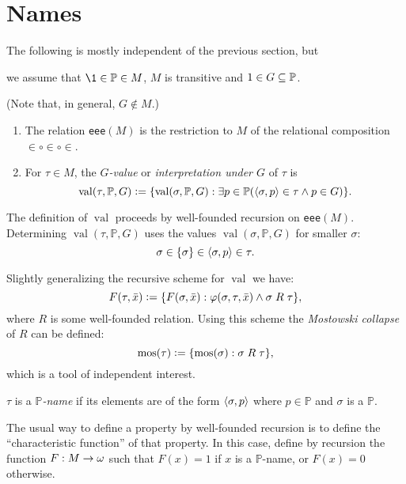 \documentclass[11pt,english]{article}
\renewcommand{\PP}{\mathbb{P}}
\DeclareMathOperator{\val}{val}
\begin{document}
\section{Names}
\begin{framed}
  The following is mostly independent of the previous section, but %
  \begin{bfseries}%
    we assume that $\1\in\PP\in M$, $M$ is transitive and 
    $1\in G\sbq\PP$.
  \end{bfseries}
  (Note that, in general, $G\notin M$.)
\end{framed}

\begin{definition}
  \begin{enumerate}
  \item The relation \verb|eee|$(M)$ is the restriction to $M$ of the
    relational composition 
    ${\in}\circ{\in}\circ{\in}$. 
  \item For $\tau\in M$, the \emph{$G$-value} or \emph{interpretation
    under $G$} of $\tau$ is
    \[
    \val(\tau,\PP,G)\defi \{\val(\sigma,\PP,G) : \exists p\in \PP
    (\lb\sigma,p\rb\in\tau \y p\in G)\}.
    \]
  \end{enumerate}
\end{definition}

The definition of $\val$ proceeds by well-founded recursion on
\verb|eee|$(M)$. Determining  $\val(\tau,\PP,G)$ uses the values
$\val(\sigma,\PP,G)$ for smaller $\sigma$:
\[
\sigma\in\{\sigma\}\in\langle\sigma,p\rangle\in\tau.
\]

\begin{remark}
  Slightly generalizing the recursive scheme for $\val$ we have:
  \[
  F(\tau,\bar{x})\mathrel{\mathop:}= \{F(\sigma,\bar{x}) : \varphi(\sigma,\tau,\bar{x}) \wedge
  \sigma\mathrel{R}\tau\}, 
  \]
  where $R$ is some well-founded relation. Using this scheme the
  \emph{Mostowski collapse} of $R$ can be defined:
  \[
  \operatorname{mos}(\tau)\mathrel{\mathop:}= \{\operatorname{mos}(\sigma) : \sigma\mathrel{R}\tau\},
  \]
  which is a tool of independent interest.
\end{remark}

\begin{definition}
  $\tau$ is a \emph{$\PP$-name} if its elements are of the form
  $\langle\sigma,p\rangle$ where $p\in\PP$ and $\sigma$ is a $\PP$.
\end{definition}
The usual way to define a property by well-founded recursion is to
define the ``characteristic function'' of that property. In this case,
define by recursion the function $F:M\to\omega$ such that $F(x)=1$  if
$x$ is a $\PP$-name, or $F(x)=0$ otherwise.
\end{document}
